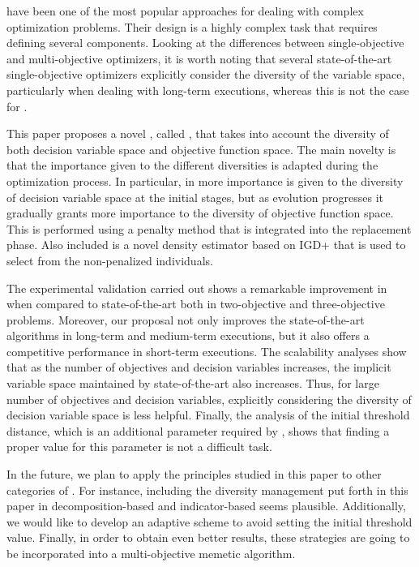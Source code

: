 \EAS{} have been one of the most popular approaches for dealing with complex optimization problems.
%
Their design is a highly complex task that requires defining several components.
%
Looking at the differences between single-objective and multi-objective optimizers, it is worth noting
that several state-of-the-art single-objective optimizers explicitly consider the diversity of the variable space, particularly
when dealing with long-term executions, whereas this is not the case for \MOEAS{}.

This paper proposes a novel \MOEA{}, called \VSDMOEA{}, that takes into account the diversity of both decision variable space
and objective function space.
%
The main novelty is that the importance given to the different diversities is adapted during the optimization process.
%
In particular, in \VSDMOEA{} more importance is given to the diversity of decision variable space at the initial stages,
but as evolution progresses it gradually grants more importance to the diversity of 
objective function space.
%
This is performed using a penalty method that is integrated into the replacement phase.
%
Also included is a novel density estimator based on IGD+ that is used to select from the non-penalized individuals.

The experimental validation carried out shows a remarkable improvement in \VSDMOEA{} when compared 
to state-of-the-art \MOEAS{} both in two-objective and three-objective problems.
%
Moreover, our proposal not only improves the state-of-the-art algorithms in long-term and medium-term executions,
but it also offers a competitive performance in short-term executions.
%
The scalability analyses show that as the number of objectives and decision variables increases, 
the implicit variable space maintained by state-of-the-art
\MOEAS{} also increases.
%
Thus, for large number of objectives and decision variables, explicitly considering the diversity of decision 
variable space is less helpful.
%
Finally, the analysis of the initial threshold distance, which is an additional parameter required by \VSDMOEA{}, 
shows that finding a proper value for this parameter is not a difficult task.

In the future, we plan to apply the principles studied in this paper to other categories of \MOEAS{}.
%
For instance, including the diversity management put forth in this paper in decomposition-based and indicator-based \MOEAS{} seems plausible.
%
Additionally, we would like to develop an adaptive scheme to avoid setting the initial threshold value.
%
Finally, in order to obtain even better results, these strategies are going to be incorporated into a multi-objective memetic algorithm.
%
